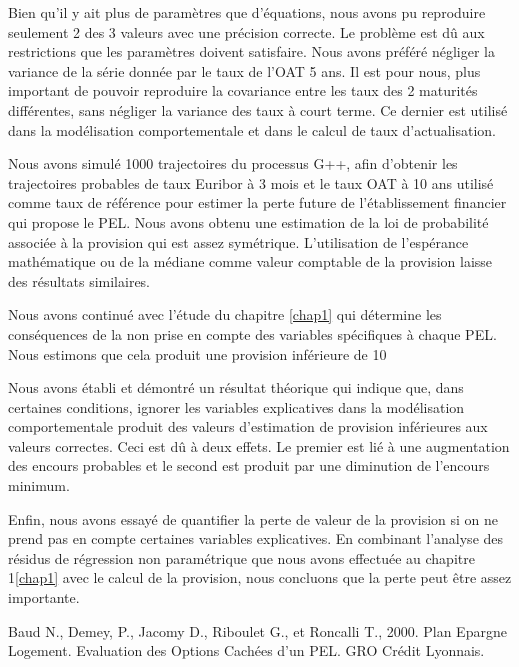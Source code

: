 \documentclass[12pt, a4paper]{book}
\begin{document}
{Bien qu'il y ait plus de paramètres que d'équations, nous avons pu reproduire seulement 2 des 3 valeurs avec une précision correcte. Le problème est dû aux restrictions que les paramètres doivent satisfaire. Nous avons préféré négliger la variance de la série donnée par le taux de l'OAT 5 ans. Il est pour nous, plus important de pouvoir reproduire la covariance entre les taux des 2 maturités différentes, sans négliger la variance des taux à court terme. Ce dernier est utilisé dans la modélisation comportementale et dans le calcul de taux d'actualisation.

Nous avons simulé 1000 trajectoires du processus G++, afin d'obtenir les trajectoires probables de taux Euribor à 3 mois et le taux OAT à 10 ans utilisé comme taux de référence pour estimer la perte future de l'établissement financier qui propose le PEL. Nous avons obtenu une estimation de la loi de probabilité associée à la provision qui est assez symétrique. L'utilisation de l'espérance mathématique ou de la médiane comme valeur comptable de la provision laisse des résultats similaires.

Nous avons continué avec l'étude du chapitre \ref{chap1} qui détermine les conséquences de la non prise en compte des variables spécifiques à chaque PEL. Nous estimons que cela produit une provision inférieure de 10 %

Nous avons établi et démontré un résultat théorique qui indique que, dans certaines conditions, ignorer les variables explicatives dans la modélisation comportementale produit des valeurs d'estimation de provision inférieures aux valeurs correctes. Ceci est dû à deux effets. Le premier est lié à une augmentation des encours probables et le second est produit par une diminution de l'encours minimum.

Enfin, nous avons essayé de quantifier la perte de valeur de la provision si on ne prend pas en compte certaines variables explicatives. En combinant l'analyse des résidus de régression non paramétrique que nous avons effectuée au chapitre 1\ref{chap1} avec le calcul de la provision, nous concluons que la perte peut être assez importante.


\begin{thebibliography}{99}


 Baud N., Demey, P., Jacomy D., Riboulet G., et Roncalli T., 2000. Plan Epargne Logement. Evaluation des Options Cachées d'un PEL. GRO Crédit Lyonnais. 


\end{thebibliography}}
\end{document}

